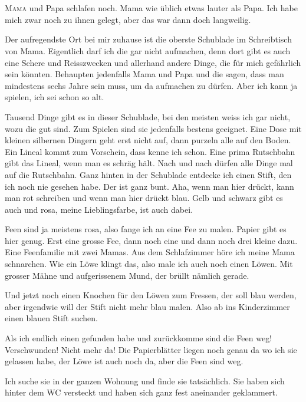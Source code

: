 \chapter*{}
\lettrine[lines=3]{\color{red}M}{ama} und Papa schlafen noch. Mama wie üblich etwas lauter als Papa. Ich habe mich zwar noch zu ihnen gelegt, aber das war dann doch langweilig. 

Der aufregendste Ort bei mir zuhause ist die oberste Schublade im Schreibtisch von Mama. Eigentlich darf ich die gar nicht aufmachen, denn dort gibt es auch eine Schere und Reisszwecken und allerhand andere Dinge, die für mich gefährlich sein könnten. Behaupten jedenfalls Mama und Papa und die sagen, dass man mindestens sechs Jahre sein muss, um da aufmachen zu dürfen. Aber ich kann ja spielen, ich sei schon so alt. 

Tausend Dinge gibt es in dieser Schublade, bei den meisten weiss ich gar nicht, wozu die gut sind. Zum Spielen sind sie jedenfalls bestens geeignet. Eine Dose mit kleinen silbernen Dingern geht erst nicht auf, dann purzeln alle auf den Boden. Ein Lineal kommt zum Vorschein, dass kenne ich schon. Eine prima Rutschbahn gibt das Lineal, wenn man es schräg hält. Nach und nach dürfen alle Dinge mal auf die Rutschbahn. Ganz hinten in der Schublade entdecke ich einen Stift, den ich noch nie gesehen habe. Der ist ganz bunt. Aha, wenn man hier drückt, kann man rot schreiben und wenn man hier drückt blau. Gelb und schwarz gibt es auch und rosa, meine Lieblingsfarbe, ist auch dabei.

Feen sind ja meistens rosa, also fange ich an eine Fee zu malen. Papier gibt es hier genug. Erst eine grosse Fee, dann noch eine und dann noch drei kleine dazu. Eine Feenfamilie mit zwei Mamas. Aus dem Schlafzimmer höre ich meine Mama schnarchen. Wie ein Löwe klingt das, also male ich auch noch einen Löwen. Mit grosser Mähne und aufgerissenem Mund, der brüllt nämlich gerade.

Und jetzt noch einen Knochen für den Löwen zum Fressen, der soll blau werden, aber irgendwie will der Stift nicht mehr blau malen. Also ab ins Kinderzimmer einen blauen Stift suchen.

Als ich endlich einen gefunden habe und zurückkomme sind die Feen weg! Verschwunden! Nicht mehr da! Die Papierblätter liegen noch genau da wo ich sie gelassen habe, der Löwe ist auch noch da, aber die Feen sind weg.

Ich suche sie in der ganzen Wohnung und finde sie tatsächlich. Sie haben sich hinter dem WC versteckt und haben sich ganz fest aneinander geklammert.

